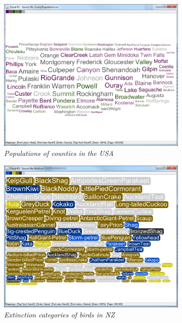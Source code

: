 \begin{figure}[!htb]
\centering
\begin{subfigure}{.5\textwidth}
	\centering
	\includegraphics[scale=0.25]{C2S2L1.png}
	\caption{\textit{Populations of counties in the USA}}
\end{subfigure}%
\begin{subfigure}{.5\textwidth}
  \centering
  \includegraphics[scale=0.25]{C1S1L2.png}
  \caption{\textit{Extinction categories of birds in NZ}}
\end{subfigure}
\begin{subfigure}{.5\textwidth}

\end{subfigure}
\end{figure}
